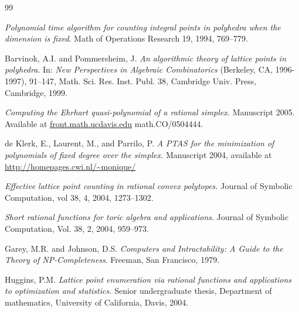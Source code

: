 \documentclass[twoside]{article}
\newcommand{\1}{{\bf 1}}
\begin{document}

\small
\begin{thebibliography}{99}

 {\em Polynomial time algorithm for
  counting integral points in polyhedra when the dimension is fixed}.
  Math of Operations Research 19, 1994, 769--779.

 {Barvinok, A.I. and Pommersheim, J.} {\em An
algorithmic theory of lattice points in polyhedra}. In: {\sl New
Perspectives in Algebraic Combinatorics} (Berkeley, CA,
1996-1997), 91--147, Math. Sci. Res.  Inst. Publ. 38, Cambridge
Univ. Press, Cambridge, 1999.

 {\em Computing the Ehrhart
    quasi-polynomial of a rational simplex.} Manuscript 2005.
Available at \url{front.math.ucdavis.edu} math.CO/0504444.

 {de Klerk, E., Laurent, M., and Parrilo, P.} {\em A
    PTAS for the minimization of polynomials of fixed degree over the
    simplex.} Manuscript 2004, available at \url{http://homepages.cwi.nl/~monique/}

 {\em Effective lattice point counting in rational convex
    polytopes.} Journal of Symbolic Computation,  vol 38, 4, 2004, 1273--1302.

 {\em Short rational functions for
  toric algebra and applications}. Journal of Symbolic Computation,
  Vol. 38, 2, 2004, 959--973.

 { Garey, M.R. and Johnson, D.S.} {\em Computers
and Intractability: A Guide to the Theory of NP-Completeness}. Freeman, San Francisco, 1979.

 {Huggins, P.M.} {\em Lattice point enumeration
via rational functions and applications to optimization and
statistics.} Senior undergraduate thesis, Department of
mathematics, University of California, Davis, 2004.


\end{thebibliography}
\end{document}
